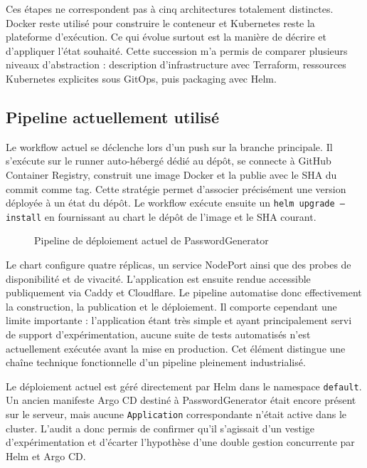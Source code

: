 Ces étapes ne correspondent pas à cinq architectures totalement distinctes. Docker reste utilisé pour construire le conteneur et Kubernetes reste la plateforme d'exécution. Ce qui évolue surtout est la manière de décrire et d'appliquer l'état souhaité. Cette succession m'a permis de comparer plusieurs niveaux d'abstraction : description d'infrastructure avec Terraform, ressources Kubernetes explicites sous GitOps, puis packaging avec Helm.

\subsection{Pipeline actuellement utilisé}

Le workflow actuel se déclenche lors d'un push sur la branche principale. Il s'exécute sur le runner auto-hébergé dédié au dépôt, se connecte à GitHub Container Registry, construit une image Docker et la publie avec le SHA du commit comme tag. Cette stratégie permet d'associer précisément une version déployée à un état du dépôt. Le workflow exécute ensuite un \texttt{helm upgrade --install} en fournissant au chart le dépôt de l'image et le SHA courant.

\begin{figure}[H]
\centering
{}
\caption{Pipeline de déploiement actuel de PasswordGenerator}
\label{fig:password-cicd}
\end{figure}

Le chart configure quatre réplicas, un service NodePort ainsi que des probes de disponibilité et de vivacité. L'application est ensuite rendue accessible publiquement via Caddy et Cloudflare. Le pipeline automatise donc effectivement la construction, la publication et le déploiement. Il comporte cependant une limite importante : l'application étant très simple et ayant principalement servi de support d'expérimentation, aucune suite de tests automatisés n'est actuellement exécutée avant la mise en production. Cet élément distingue une chaîne technique fonctionnelle d'un pipeline pleinement industrialisé.

Le déploiement actuel est géré directement par Helm dans le namespace \texttt{default}. Un ancien manifeste Argo CD destiné à PasswordGenerator était encore présent sur le serveur, mais aucune \texttt{Application} correspondante n'était active dans le cluster. L'audit a donc permis de confirmer qu'il s'agissait d'un vestige d'expérimentation et d'écarter l'hypothèse d'une double gestion concurrente par Helm et Argo CD.


